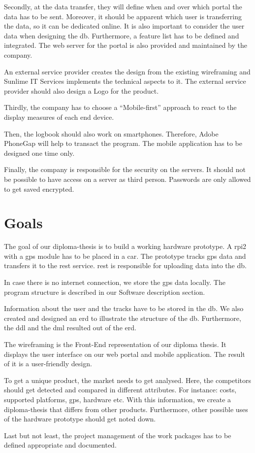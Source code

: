 Secondly, at the data transfer, they will define when and over which portal the data has to be sent. Moreover, it should be apparent which user is transferring the data, so it can be dedicated online. It is also important to consider the user data when designing the \gls{db}. Furthermore, a feature list has to be defined and integrated.
The web server for the portal is also provided and maintained by the company.

An external service provider creates the design from the existing wireframing and Sunlime IT Services implements the technical aspects to it. The external service provider should also design a Logo for the product.

Thirdly, the company has to choose a “Mobile-first” approach to react to the display measures of each end device.

Then, the logbook should also work on smartphones. Therefore, Adobe PhoneGap will help to transact the program. The mobile application has to be designed one time only.

Finally, the company is responsible for the security on the servers. It should not be possible to have access on a server as third person. Passwords are only allowed to get saved encrypted.
\newpage
\section*{Goals}
The goal of our diploma-thesis is to build a working hardware prototype. A \gls{rpi2} with a \gls{gps} module has to be placed in a car. The prototype tracks \gls{gps} data and transfers it to the \gls{rest} service. \gls{rest} is responsible for uploading data into the \gls{db}. 

In case there is no internet connection, we store the \gls{gps} data locally. The program structure is described in our Software description section.

Information about the user and the tracks have to be stored in the \gls{db}. We also created and designed an \gls{erd} to illustrate the structure of the \gls{db}. Furthermore, the \gls{ddl} and the \gls{dml} resulted out of the \gls{erd}.

The wireframing is the Front-End representation of our diploma thesis. It displays the user interface on our web portal and mobile application. The result of it is a user-friendly design.

To get a unique product, the market needs to get analysed. Here, the competitors should get detected and compared in different attributes. For instance: costs, supported platforms, \gls{gps}, hardware etc. With this information, we create a diploma-thesis that differs from other products. Furthermore, other possible uses of the hardware prototype should get noted down.

Last but not least, the project management of the work packages has to be defined appropriate and documented.
